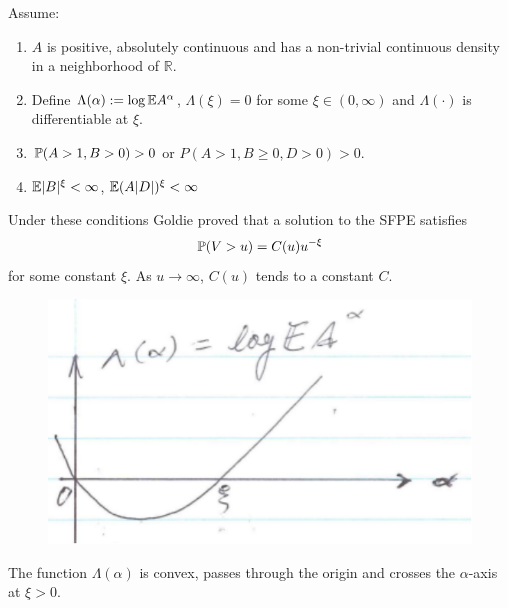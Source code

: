 \documentclass{beamer}
\begin{document}
\begin{frame}
Assume:
\begin{enumerate}
\item $A$ is positive, absolutely continuous and has a non-trivial continuous density in
  a neighborhood of $\mathbb R$.
\item Define $\Lambda(\alpha) := \log \E A^\alpha$, $\Lambda(\xi) = 0$ for some $\xi \in (0,
  \infty)$ and $\Lambda(\cdot)$ is differentiable at $\xi$.
\item $\P(A > 1, B > 0) > 0$ or $P(A > 1, B \geq 0, D > 0) > 0$.
\item $\E |B|^\xi < \infty$, $\E (A|D|)^\xi < \infty$
\end{enumerate}
Under these conditions Goldie proved that a solution to the
SFPE satisfies
\[
\P(V > u) = C(u) u^{-\xi}
\]
for some constant $\xi$. As $u \to \infty$, $C(u)$ tends to a constant
$C$.
\end{frame}

\begin{frame}
  \begin{figure}[htb!]
    \centering
    \includegraphics[scale=0.8]{pic2.pdf}
  \end{figure}
  The function $\Lambda(\alpha)$ is convex, passes through the origin
  and crosses the $\alpha$-axis at $\xi > 0$.
\end{frame}
\end{document}
